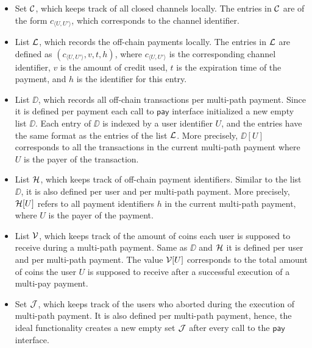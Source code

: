 \begin{itemize}
	\item Set $\mathcal{C}$, which keeps track of all closed channels locally. The entries in $\mathcal{C}$ 
	are of the form $c_{\langle U,U' \rangle}$, which corresponds to the channel identifier.
	\item List $\mathcal{L}$, which records the off-chain payments locally. The entries in $\mathcal{L}$ are 
	defined as $(c_{\langle U,U' \rangle}, v, t, h)$, where $c_{\langle U,U' \rangle}$ is the 
	corresponding channel identifier, $v$ is the amount of credit used, $t$ is the expiration 
	time of the payment, and $h$ is the identifier for this entry.
	\item List $\DD$, which records all off-chain transactions per multi-path payment. Since it 
	is defined per payment each call to $\mathsf{pay}$ interface initialized a new empty list 
	$\DD$. Each entry of $\DD$ is indexed by a user identifier $U$, and the entries have the 
	same format as the entries of the list $\mathcal{L}$. More precisely, $\DD[U]$ corresponds to all 
	the transactions in the current multi-path payment where $U$ is the payer of the transaction. 
	\item List $\mathcal{H}$, which keeps track of off-chain payment identifiers. Similar to the list 
	$\DD$, it is also defined per user and per multi-path payment. More precisely, $\mathcal{H}[U]$ 
	refers to all payment identifiers $h$ in the current multi-path payment, where $U$ is the 
	payer of the payment.
	\item List $\mathcal{V}$, which keeps track of the amount of coins each user is supposed to receive 
	during a multi-path payment. Same as $\DD$ and $\mathcal{H}$ it is defined per user and per 
	multi-path payment. The value $\mathcal{V}[U]$ corresponds to the total amount of coins the user $U$ 
	is supposed to receive after a successful execution of a multi-pay payment.
	\item Set $\mathcal{J}$, which keeps track of the users who aborted during the execution of 
	multi-path payment. It is also defined per multi-path payment, hence, the ideal functionality 
	creates a new empty set $\mathcal{J}$ after every call to the $\mathsf{pay}$ interface.
\end{itemize}
	
